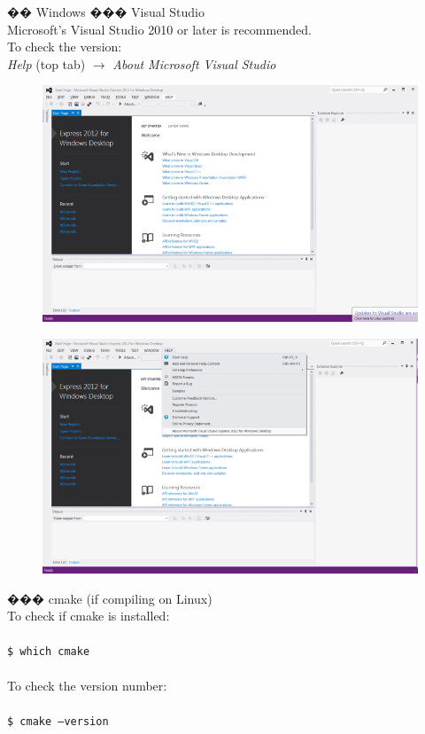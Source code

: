 \begin{easylist}[articletoc]
�� Windows
��� Visual Studio\\
Microsoft's Visual Studio 2010 or later is recommended.\\
To check the version:\\
\textit{Help} (top tab) $\to$ \textit{About Microsoft Visual Studio}
\begin{figure}[H]
\centering
\includegraphics[scale=0.6]{images/vshelp}
\end{figure}
\begin{figure}[H]
\centering
\includegraphics[scale=0.6]{images/vsabout}
\end{figure}

��� cmake (if compiling on Linux)\\
To check if cmake is installed:\\\\
\texttt{\$ which cmake}\\\\
To check the version number:\\\\
\texttt{\$ cmake --version}\\


\end{easylist}
